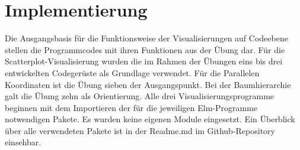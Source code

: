 \documentclass[usegeometry=true]{scrartcl}
\begin{document}
\section{Implementierung}
Die Ausgangsbasis für die Funktionsweise der Visualisierungen auf Codeebene  stellen die Programmcodes mit ihren Funktionen aus der Übung dar. Für die Scatterplot-Visualisierung wurden die im Rahmen der Übungen eins bis drei entwickelten Codegerüste als Grundlage verwendet. Für die Parallelen Koordinaten ist die Übung sieben der Ausgangspunkt. Bei der Baumhierarchie galt die Übung zehn als Orientierung. 
Alle drei Visualisierungsprogramme beginnen mit dem Importieren der für die jeweiligen Elm-Programme notwendigen Pakete. Es wurden keine eigenen Module eingesetzt. Ein Überblick über alle verwendeten Pakete ist in der Readme.md im Github-Repository einsehbar. 
\end{document}
